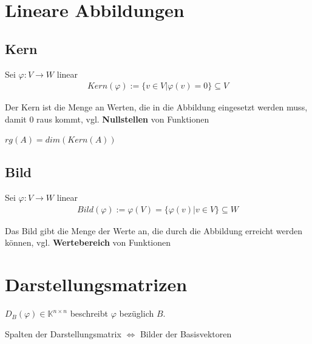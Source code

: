 \documentclass{scrartcl}
\begin{document}
\newpage
\section{Lineare Abbildungen}

\subsection{Kern}
\begin{Def}
Sei $\varphi: V \rightarrow W$ linear
\begin{align*}
    Kern(\varphi) := \{v \in V | \varphi(v) = 0\} \subseteq V
\end{align*}
\end{Def}
\begin{Notiz}
Der Kern ist die Menge an Werten, die in die Abbildung eingesetzt werden muss, damit $0$ raus kommt, vgl. \textbf{Nullstellen} von Funktionen
\end{Notiz}

\begin{Notiz}
$rg(A) = dim(Kern(A))$
\end{Notiz}

\subsection{Bild}
\begin{Def}
Sei $\varphi: V \rightarrow W$ linear
\begin{align*}
    Bild(\varphi) := \varphi(V) = \{\varphi(v) | v \in V \} \subseteq W
\end{align*}
\end{Def}
\begin{Notiz}
Das Bild gibt die Menge der Werte an, die durch die Abbildung erreicht werden können, vgl. \textbf{Wertebereich} von Funktionen
\end{Notiz}

\newpage
\section{Darstellungsmatrizen}
\label{Darstellungsmatrix}

\begin{Def}

$D_B(\varphi) \in \mathbb{K}^{n \times n} $ beschreibt $\varphi$ bezüglich $B$.

\end{Def}

\begin{Notiz}
  Spalten der Darstellungsmatrix $\Leftrightarrow$ Bilder der Basisvektoren
\end{Notiz}
\end{document}
